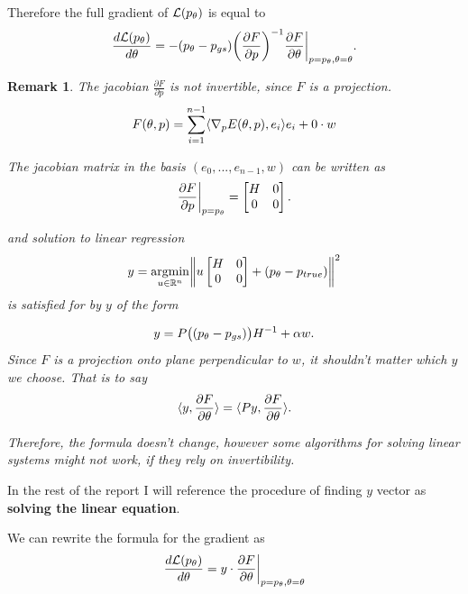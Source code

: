 \documentclass[a4paper,10pt]{report}
\newtheorem{remark}{Remark}
\begin{document}
Therefore the full gradient of $\mathcal{L}(p_\theta)$ is equal to
\begin{equation}
 \frac{d\mathcal{L}(p_\theta)}{d \theta} = - (p_\theta - p_{gs})\bigg(\frac{\partial F}{\partial p}\bigg)^{-1}  \frac{\partial F}{\partial \theta}\bigg|_{p=p_\theta, \theta=\theta}.
\end{equation}
\begin{remark}
 The jacobian $\frac{\partial F}{\partial p}$ is not invertible, since $F$ is a projection.
 \begin{equation}
  F(\theta, p) = \sum_{i=1}^{n-1} \langle \nabla_p E(\theta, p), e_i \rangle e_i +  0 \cdot w
 \end{equation}

 The jacobian matrix in the basis $(e_0,...,e_{n-1},w)$ can be written as \begin{equation}
                      \frac{\partial F}{\partial p}\bigg|_{p=p_\theta} =\begin{bmatrix}
H & 0 \\
0 & 0
\end{bmatrix}.
                     \end{equation}



and solution to linear regression
\begin{equation}
 y = \underset{u\in \mathbb{R}^n}{\mathrm{argmin }}\bigg\|u \begin{bmatrix}
H & 0 \\
0 & 0
\end{bmatrix} + (p_\theta-p_{true})\bigg\|^2
\end{equation}
is satisfied for by $y$ of the form

\begin{equation}
 y = P\big((p_\theta-p_{gs})\big)H^{-1} + \alpha w.
\end{equation}
Since $F$ is a projection onto plane perpendicular to $w$, it shouldn't matter which $y$ we choose.
That is to say
\begin{equation}
 \langle y,  \frac{\partial F}{\partial \theta} \rangle=\langle Py, \frac{\partial F}{\partial \theta} \rangle.
\end{equation}

Therefore, the formula doesn't change, however some algorithms for solving linear systems might not work, if they rely on invertibility.

\end{remark}
In the rest of the report I will reference the procedure of finding $y$ vector as \textbf{solving the linear equation}.


We can rewrite the formula for the gradient as
\begin{equation}
 \frac{d\mathcal{L}(p_\theta)}{d \theta} = y \cdot  \frac{\partial F}{\partial \theta}\bigg|_{p=p_\theta, \theta=\theta}
\end{equation}
\end{document}
